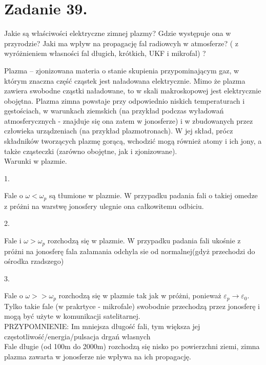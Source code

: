 \section*{Zadanie 39.}
\begin{task}
Jakie są właściwości elektryczne zimnej plazmy? Gdzie występuje ona w przyrodzie? Jaki ma wpływ na propagację fal radiowcyh w atmosferze? ( z wyróżnieniem własności fal długich, krótkich, UKF i mikrofal) ?\\
\end{task}


\begin{solution}
Plazma – zjonizowana materia o stanie skupienia przypominającym gaz, w którym znaczna część cząstek jest naładowana elektrycznie. Mimo że plazma zawiera swobodne cząstki naładowane, to w skali makroskopowej jest elektrycznie obojętna.
Plazma zimna powstaje przy odpowiednio niskich temperaturach i gęstościach, w warunkach ziemskich (na przykład podczas wyładowań atmosferycznych - znajduje się ona zatem w jonosferze) i w zbudowanych przez człowieka urządzeniach (na przykład plazmotronach). W jej skład, prócz składników tworzących plazmę gorącą, wchodzić mogą również atomy i ich jony, a także cząsteczki (zarówno obojętne, jak i zjonizowane).\\
Warunki w plazmie.\\
\begin{textbf} {1.}\end{textbf} Fale o $\omega < \omega_{p}$ są tłumione w plazmie. W przypadku padania fali o takiej omedze z próżni na warstwę jonosfery ulegnie ona całkowitemu odbiciu.\\
\begin{textbf} {2.}\end{textbf} Fale i $\omega > \omega_{p}$ rozchodzą się w plazmie. W przypadku padania fali ukośnie z próżni na jonosferę fala załamania odchyla sie od normalnej(gdyż przechodzi do ośrodka rzadszego)\\
\begin{textbf} {3.}\end{textbf} Fale o $\omega >> \omega_{p}$ rozchodzą się w plazmie tak jak w próżni, ponieważ $\varepsilon_{p} \longrightarrow \varepsilon_{0}$. Tylko takie fale (w prakrtyce - mikrofale) swobodnie przechodzą przez jonosferę i mogą być użyte w komunikacji satelitarnej.\\
PRZYPOMNIENIE: Im mniejsza długość fali, tym większa jej częstotliwość/energia/pulsacja drgań własnych\\
Fale długie (od 100m do 2000m) rozchodzą się nisko po powierzchni ziemi, zimna plazma zawarta w jonosferze nie wpływa na ich propagację.\\

\end{solution}
